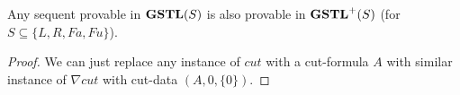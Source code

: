 \begin{thm}\label{cor:nc-riddance} Any sequent provable in $\mathbf{GSTL}(S)$ is also provable in $\mathbf{GSTL}^+(S)$ (for $S \subseteq \{L, R, Fa, Fu\}$).
\end{thm}
\begin{proof}
	We can just replace any instance of $cut$ with a cut-formula $A$ with similar instance of $\nabla cut$ with cut-data $(A, 0, \{0\})$.
\end{proof}